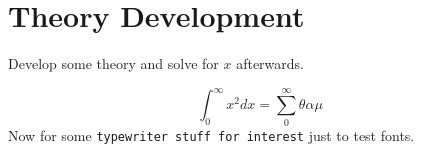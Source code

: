 \chapter{Theory Development}

Develop some theory and solve for $x$ afterwards.

$$\int_{0}^{\infty}x^2dx = \sum_{0}^{\infty} \theta \alpha \mu$$
Now for some \texttt{typewriter stuff for interest} just to test fonts.
\\
\lipsum[1-7]